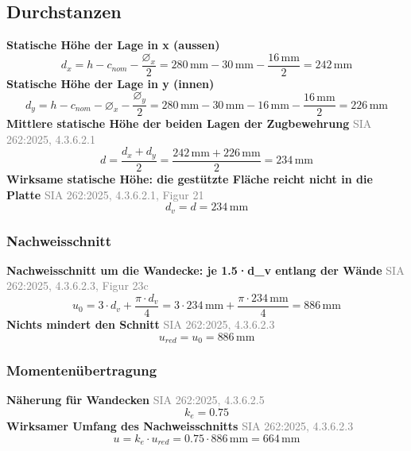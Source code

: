 \documentclass[11pt,a4paper]{article}
\newcommand{\normref}[1]{{\small\textcolor{gray}{#1}}}
\begin{document}
\subsection{Durchstanzen}
\noindent\textbf{Statische Höhe der Lage in x (aussen)}
\begin{equation*}
d_x = h - c_{nom} - \frac{\varnothing_x}{2} = 280\,\mathrm{mm} - 30\,\mathrm{mm} - \frac{16\,\mathrm{mm}}{2} = 242\,\mathrm{mm}
\end{equation*}
\noindent\textbf{Statische Höhe der Lage in y (innen)}
\begin{equation*}
d_y = h - c_{nom} - \varnothing_x - \frac{\varnothing_y}{2} = 280\,\mathrm{mm} - 30\,\mathrm{mm} - 16\,\mathrm{mm} - \frac{16\,\mathrm{mm}}{2} = 226\,\mathrm{mm}
\end{equation*}
\noindent\textbf{Mittlere statische Höhe der beiden Lagen der Zugbewehrung} \hfill \normref{SIA 262:2025, 4.3.6.2.1}
\begin{equation*}
d = \frac{d_x + d_y}{2} = \frac{242\,\mathrm{mm} + 226\,\mathrm{mm}}{2} = 234\,\mathrm{mm}
\end{equation*}
\noindent\textbf{Wirksame statische Höhe: die gestützte Fläche reicht nicht in die Platte} \hfill \normref{SIA 262:2025, 4.3.6.2.1, Figur 21}
\begin{equation*}
d_v = d = 234\,\mathrm{mm}
\end{equation*}
\subsubsection{Nachweisschnitt}
\noindent\textbf{Nachweisschnitt um die Wandecke: je 1.5·d\_v entlang der Wände} \hfill \normref{SIA 262:2025, 4.3.6.2.3, Figur 23c}
\begin{equation*}
u_0 = 3 \cdot d_v + \frac{\pi \cdot d_v}{4} = 3 \cdot 234\,\mathrm{mm} + \frac{\pi \cdot 234\,\mathrm{mm}}{4} = 886\,\mathrm{mm}
\end{equation*}
\noindent\textbf{Nichts mindert den Schnitt} \hfill \normref{SIA 262:2025, 4.3.6.2.3}
\begin{equation*}
u_{red} = u_0 = 886\,\mathrm{mm}
\end{equation*}
\subsubsection{Momentenübertragung}
\noindent\textbf{Näherung für Wandecken} \hfill \normref{SIA 262:2025, 4.3.6.2.5}
\begin{equation*}
k_e = 0.75
\end{equation*}
\noindent\textbf{Wirksamer Umfang des Nachweisschnitts} \hfill \normref{SIA 262:2025, 4.3.6.2.3}
\begin{equation*}
u = k_e \cdot u_{red} = 0.75 \cdot 886\,\mathrm{mm} = 664\,\mathrm{mm}
\end{equation*}
\end{document}
